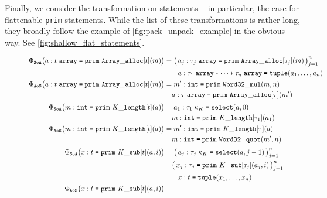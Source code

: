 Finally, we consider the transformation on statements -- in particular, the case
for flattenable \texttt{prim} statements. While the list of these
transformations is rather long, they broadly follow the example
of \cref{fig:pack_unpack_example} in the obvious way.
See \cref{fig:shallow_flat_statements}.

\begin{figure}[htbp]
  \centering
  \footnotesize
  \setlength{\abovedisplayskip}{2pt}
  \setlength{\belowdisplayskip}{2pt}
  \setlength{\jot}{1pt}
  \[
  \begin{aligned}
    \Phi_{\texttt{SoA}}\big(a : t\;\mathtt{array} \syneq \mathtt{prim\ Array\_alloc}[t](m)\big)
      &= \big(\, a_j : \tau_j\;\mathtt{array} \syneq \mathtt{prim\ Array\_alloc}[\tau_j](m) \,\big)_{j=1}^{n} \\
      &\phantom{{}= \big(\,} a : \tau_1\;\mathtt{array} * \cdots * \tau_n\;\mathtt{array} \syneq \mathtt{tuple}(a_1, \dots, a_n) \\
    \Phi_{\texttt{AoS}}\big(a : t\;\mathtt{array} \syneq \mathtt{prim\ Array\_alloc}[t](m)\big)
      &= m' : \mathtt{int} \syneq \mathtt{prim\ Word32\_mul}(m, n) \\
      &\phantom{{}=} a : \tau\;\mathtt{array} \syneq \mathtt{prim\ Array\_alloc}[\tau](m') \\[2pt]
    \Phi_{\texttt{SoA}}\big(m : \mathtt{int} \syneq \mathtt{prim}\ K\mathtt{\_length}[t](a)\big)
      &= a_1 : \tau_1\;\kappa_K \syneq \mathtt{select}(a, 0) \\
      &\phantom{{}=} m : \mathtt{int} \syneq \mathtt{prim}\ K\mathtt{\_length}[\tau_1](a_1) \\
    \Phi_{\texttt{AoS}}\big(m : \mathtt{int} \syneq \mathtt{prim}\ K\mathtt{\_length}[t](a)\big)
      &= m' : \mathtt{int} \syneq \mathtt{prim}\ K\mathtt{\_length}[\tau](a) \\
      &\phantom{{}=} m : \mathtt{int} \syneq \mathtt{prim\ Word32\_quot}(m', n) \\[2pt]
    \Phi_{\texttt{SoA}}\big(x : t \syneq \mathtt{prim}\ K\mathtt{\_sub}[t](a, i)\big)
      &= \big(\, a_j : \tau_j\;\kappa_K \syneq \mathtt{select}(a, j-1) \,\big)_{j=1}^{n} \\
      &\phantom{{}=} \big(\, x_j : \tau_j \syneq \mathtt{prim}\ K\mathtt{\_sub}[\tau_j](a_j, i) \,\big)_{j=1}^{n} \\
      &\phantom{{}= \big(\,} x : t \syneq \mathtt{tuple}(x_1, \dots, x_n) \\
    \Phi_{\texttt{AoS}}\big(x : t \syneq \mathtt{prim}\ K\mathtt{\_sub}[t](a, i)\big)

\end{aligned}\]
\end{figure}
